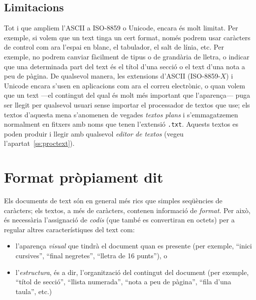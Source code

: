 \subsection{Limitacions}

Tot i que ampliem l'ASCII a ISO-8859 o Unicode, encara és molt
limitat.  Per exemple, si volem que un text tinga un cert format,
només podrem usar caràcters de control com ara l'espai en blanc, el
tabulador, el salt de línia, etc.  Per exemple, no podrem canviar
fàcilment de tipus o de grandària de lletra, o indicar que una
determinada part del text és el títol d'una secció o el text d'una
nota a peu de pàgina. De qualsevol manera, les extensions d'ASCII
(ISO-8859-$X$) i Unicode encara s'usen en aplicacions com ara el
correu electrònic, o quan volem que un text ---el contingut del qual
és molt més important que l'aparença--- puga ser llegit per qualsevol
usuari sense importar el processador de textos que use; els textos
d'aquesta mena s'anomenen de vegades \emph{textos plans} i
s'emmagatzemen normalment en fitxers amb noms que tenen l'extensió
\texttt{.txt}.  Aquests textos es poden produir i llegir amb qualsevol
\emph{editor de textos} (vegeu l'apartat~\ref{ss:proctext}).

\section{Format pròpiament dit}\label{ss:format}
Els documents de text són en general més rics que simples seqüències
de caràcters; els textos, a més de caràcters, contenen informació de
\emph{format}. Per això, és necessària l'assignació de \emph{codis}
(que també es convertiran en octets) per a regular altres
característiques del text com:
\begin{itemize}
\item l'aparença \emph{visual} que tindrà el document quan es presente
  (per exemple, ``inici cursives'', ``final negretes'', ``lletra de 16
  punts''), o
  \item l'\emph{estructura}, és a dir, l'organització del contingut
    del document (per exemple, ``títol de secció'', ``llista
    numerada'', ``nota a peu de pàgina'', ``fila d'una taula'', etc.)
\end{itemize}

